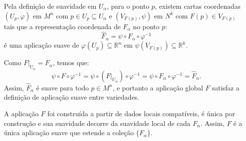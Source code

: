 {	Pela definição de suavidade em $U_\alpha$, para o ponto $p$, existem cartas coordenadas $(U_p, \varphi)$ em $M^n$ com $p \in U_p \subseteq U_\alpha$ e $(V_{F(p)}, \psi)$ em $N^k$ com $F(p) \in V_{F(p)}$ tais que a representação coordenada de $F_\alpha$ no ponto $p$:
	\begin{equation*}
		\hat{F}_\alpha = \psi \circ F_\alpha \circ \varphi^{-1}
	\end{equation*}
	é uma aplicação suave de $\varphi(U_p) \subseteq \mathbb{R}^n$ em $\psi(V_{F(p)}) \subseteq \mathbb{R}^k$.
	
	Como $F \big|_{U_\alpha} = F_\alpha$, temos que:
	\begin{equation*}
		\psi \circ F \circ \varphi^{-1} = \psi \circ (F \big|_{U_\alpha}) \circ \varphi^{-1} = \psi \circ F_\alpha \circ \varphi^{-1} = \hat{F}_\alpha.
	\end{equation*}
	Assim, $\hat{F}_\alpha$ é suave para todo $p \in M^n$, e portanto a aplicação global $F$ satisfaz a definição de aplicação suave entre variedades.
	
	A aplicação $F$ foi construída a partir de dados locais compatíveis, é única por construção e sua suavidade decorre da suavidade local de cada $F_\alpha$. Assim, $F$ é a única aplicação suave que estende a coleção $\{F_\alpha\}$.
}
